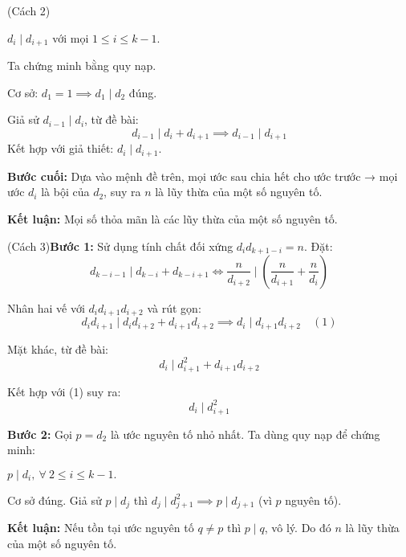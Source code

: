 \documentclass[../01-divisibility.tex]{subfiles}
\begin{document}
\bigbreak

\begin{soln}(Cách 2)\footnotemark[\value{footnote}]
    \begin{claim*}
        \( d_i \mid d_{i+1} \) với mọi \( 1 \leq i \leq k - 1 \).
    \end{claim*}
    \begin{subproof}
        Ta chứng minh bằng quy nạp.

        Cơ sở: \( d_1 = 1 \implies d_1 \mid d_2 \) đúng.

        Giả sử \( d_{i-1} \mid d_i \), từ đề bài:
        \[
            d_{i-1} \mid d_i + d_{i+1} \implies d_{i-1} \mid d_{i+1}
        \]
        Kết hợp với giả thiết: \( d_i \mid d_{i+1} \).
    \end{subproof}

    \textbf{Bước cuối:} Dựa vào mệnh đề trên, mọi ước sau chia hết cho ước trước → mọi ước \( d_i \) là bội của \( d_2 \), suy ra \( n \) là lũy thừa của một số nguyên tố.

    \textbf{Kết luận:} Mọi số thỏa mãn là các lũy thừa của một số nguyên tố.
\end{soln}

\newpage

\begin{soln}(Cách 3)\footnotemark[\value{footnote}]
    \textbf{Bước 1:} Sử dụng tính chất đối xứng \( d_i d_{k+1-i} = n \). Đặt:
    \[
        d_{k-i-1} \mid d_{k-i} + d_{k-i+1} \Leftrightarrow \frac{n}{d_{i+2}} \mid \left( \frac{n}{d_{i+1}} + \frac{n}{d_i} \right)
    \]

    Nhân hai vế với \( d_i d_{i+1} d_{i+2} \) và rút gọn:
    \[
        d_i d_{i+1} \mid d_i d_{i+2} + d_{i+1} d_{i+2} \implies d_i \mid d_{i+1} d_{i+2} \quad (1)
    \]

    Mặt khác, từ đề bài:
    \[
        d_i \mid d_{i+1}^2 + d_{i+1} d_{i+2}
    \]

    Kết hợp với (1) suy ra:
    \[
        d_i \mid d_{i+1}^2
    \]

    \textbf{Bước 2:} Gọi \( p = d_2 \) là ước nguyên tố nhỏ nhất. Ta dùng quy nạp để chứng minh:

    \begin{claim*}
        \( p \mid d_i,\ \forall\ 2 \leq i \leq k - 1. \)
    \end{claim*}
    \begin{subproof}
        Cơ sở đúng. Giả sử \( p \mid d_j \) thì \( d_j \mid d_{j+1}^2 \implies p \mid d_{j+1} \) (vì \( p \) nguyên tố).
    \end{subproof}

    \textbf{Kết luận:} Nếu tồn tại ước nguyên tố \( q \ne p \) thì \( p \mid q \), vô lý. Do đó \( n \) là lũy thừa của một số nguyên tố.
\end{soln}

\end{document}
